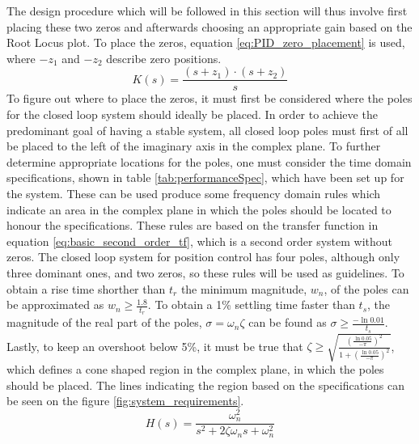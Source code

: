 \documentclass[../../main.tex]{subfiles}
\begin{document}
The design procedure which will be followed in this section will thus involve first placing these two zeros and afterwards choosing an appropriate gain based on the Root Locus plot. To place the zeros, equation \ref{eq:PID_zero_placement} is used, where $-z_1$ and $-z_2$ describe zero positions.
\begin{equation}\label{eq:PID_zero_placement}
    K(s) = \frac{(s+z_1)\cdot(s+z_2)}{s}
\end{equation}
To figure out where to place the zeros, it must first be considered where the poles for the closed loop system should ideally be placed. In order to achieve the predominant goal of having a stable system, all closed loop poles must first of all be placed to the left of the imaginary axis in the complex plane. To further determine appropriate locations for the poles, one must consider the time domain specifications, shown in table \ref{tab:performanceSpec}, which have been set up for the system. These can be used produce some frequency domain rules which indicate an area in the complex plane in which the poles should be located to honour the specifications. These rules are based on the transfer function in equation \ref{eq:basic_second_order_tf}, which is a second order system without zeros. The closed loop system for position control has four poles, although only three dominant ones, and two zeros, so these rules will be used as guidelines. To obtain a rise time shorther than $t_r$ the minimum magnitude, $w_n$, of the poles can be approximated as $w_n\geq\frac{1.8}{t_r}$. To obtain a 1\% settling time faster than $t_s$, the magnitude of the real part of the poles, $\sigma = \omega_n \zeta$ can be found as $\sigma \geq \frac{-\ln{0.01}}{t_s} $. Lastly, to keep an overshoot below 5\%, it must be true that $\zeta \geq \sqrt{\frac{(\frac{\ln{0.05}}{-\pi})^2}{1+(\frac{\ln{0.05}}{-\pi})^2}}$, which defines a cone shaped region in the complex plane, in which the poles should be placed. The lines indicating the region based on the specifications can be seen on the figure \ref{fig:system_requirements}.
\begin{equation} \label{eq:basic_second_order_tf}
    H(s) = \frac{\omega_n^2}{s^2 + 2\zeta \omega_n s + \omega_n^2}
\end{equation}
\end{document}
